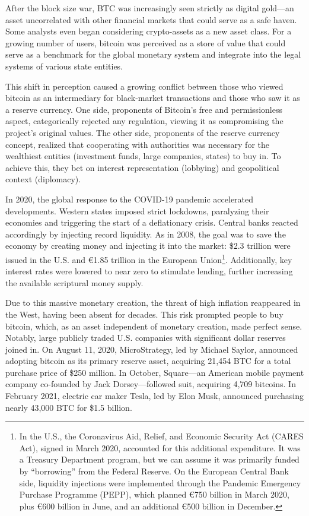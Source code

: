 \documentclass[
  a5paper,
  smalldemyvopaper,10pt,twoside,onecolumn,openright,extrafontsizes,hidelinks]{memoir}
\begin{document}
After the block size war, BTC was increasingly seen strictly as digital
gold---an asset uncorrelated with other financial markets that could
serve as a safe haven. Some analysts even began considering
crypto-assets as a new asset class. For a growing number of users,
bitcoin was perceived as a store of value that could serve as a
benchmark for the global monetary system and integrate into the legal
systems of various state entities.

This shift in perception caused a growing conflict between those who
viewed bitcoin as an intermediary for black-market transactions and
those who saw it as a reserve currency. One side, proponents of
Bitcoin's free and permissionless aspect, categorically rejected any
regulation, viewing it as compromising the project's original values.
The other side, proponents of the reserve currency concept, realized
that cooperating with authorities was necessary for the wealthiest
entities (investment funds, large companies, states) to buy in. To
achieve this, they bet on interest representation (lobbying) and
geopolitical context (diplomacy).

In 2020, the global response to the COVID-19 pandemic accelerated
developments. Western states imposed strict lockdowns, paralyzing their
economies and triggering the start of a deflationary crisis. Central
banks reacted accordingly by injecting record liquidity. As in 2008, the
goal was to save the economy by creating money and injecting it into the
market: \$2.3 trillion were issued in the U.S. and €1.85 trillion in the
European Union\footnote{In the U.S., the Coronavirus Aid, Relief, and
  Economic Security Act (CARES Act), signed in March 2020, accounted for
  this additional expenditure. It was a Treasury Department program, but
  we can assume it was primarily funded by ``borrowing'' from the
  Federal Reserve. On the European Central Bank side, liquidity
  injections were implemented through the Pandemic Emergency Purchase
  Programme (PEPP), which planned €750 billion in March 2020, plus €600
  billion in June, and an additional €500 billion in December.}.
Additionally, key interest rates were lowered to near zero to stimulate
lending, further increasing the available scriptural money supply.

Due to this massive monetary creation, the threat of high inflation
reappeared in the West, having been absent for decades. This risk
prompted people to buy bitcoin, which, as an asset independent of
monetary creation, made perfect sense. Notably, large publicly traded
U.S. companies with significant dollar reserves joined in. On August 11,
2020, MicroStrategy, led by Michael Saylor, announced adopting bitcoin
as its primary reserve asset, acquiring 21,454 BTC for a total purchase
price of \$250 million. In October, Square---an American mobile payment
company co-founded by Jack Dorsey---followed suit, acquiring 4,709
bitcoins. In February 2021, electric car maker Tesla, led by Elon Musk,
announced purchasing nearly 43,000 BTC for \$1.5 billion.
\end{document}
